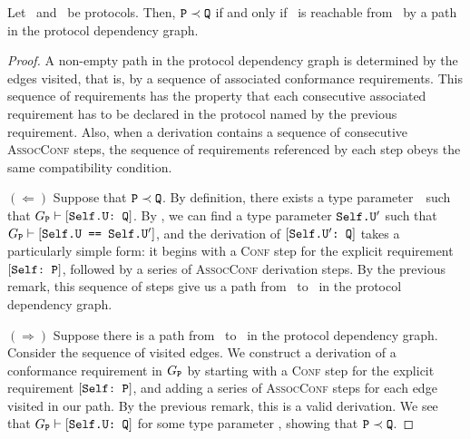 \documentclass[../generics]{subfiles}
\begin{document}
\begin{proposition}
Let \tP\ and \tQ\ be protocols. Then, $\texttt{P}\prec\texttt{Q}$ if and only if \tQ\ is reachable from \tP\ by a path in the protocol dependency graph.
\end{proposition}
\begin{proof}
A non-empty path in the protocol dependency graph is determined by the edges visited, that is, by a sequence of associated conformance requirements. This sequence of requirements has the property that each consecutive associated requirement has to be declared in the protocol named by the previous requirement. Also, when a derivation contains a sequence of consecutive \textsc{AssocConf} steps, the sequence of requirements referenced by each step obeys the same compatibility condition.

$(\Leftarrow)$ Suppose that $\texttt{P}\prec\texttt{Q}$. By definition, there exists a type parameter~\SelfU\ such that $G_{\texttt{P}}\vdash[\texttt{Self.U:~Q}]$. By , we can find a type parameter $\texttt{Self.U}^\prime$ such that $G_{\texttt{P}}\vdash[\texttt{Self.U == $\texttt{Self.U}^\prime$}]$, and the derivation of $[\texttt{$\texttt{Self.U}^\prime$:~Q}]$ takes a particularly simple form: it begins with a \textsc{Conf} step for the explicit requirement $[\texttt{Self:~P}]$, followed by a series of \textsc{AssocConf} derivation steps. By the previous remark, this sequence of steps give us a path from \tP\ to \tQ\ in the protocol dependency graph.

$(\Rightarrow)$ Suppose there is a path from \tP\ to \tQ\ in the protocol dependency graph. Consider the sequence of visited edges. We construct a derivation of a conformance requirement in $G_{\texttt{P}}$ by starting with a \textsc{Conf} step for the explicit requirement $[\texttt{Self:~P}]$, and adding a series of \textsc{AssocConf} steps for each edge visited in our path. By the previous remark, this is a valid derivation. We see that $G_{\texttt{P}}\vdash[\texttt{Self.U:~Q}]$ for some type parameter \SelfU, showing that $\texttt{P}\prec\texttt{Q}$.
\end{proof}
\end{document}
